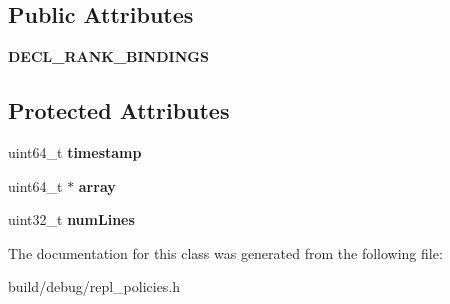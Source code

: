 \subsection*{Public Attributes}
\begin{DoxyCompactItemize}
\item 
\hypertarget{classLRUReplPolicy_a5ccee6aca3822b36fe38b89c3ce198b7}{{\bfseries D\-E\-C\-L\-\_\-\-R\-A\-N\-K\-\_\-\-B\-I\-N\-D\-I\-N\-G\-S}}\label{classLRUReplPolicy_a5ccee6aca3822b36fe38b89c3ce198b7}

\end{DoxyCompactItemize}
\subsection*{Protected Attributes}
\begin{DoxyCompactItemize}
\item 
\hypertarget{classLRUReplPolicy_a65b4e89421966a1190dbff428fc5ea06}{uint64\-\_\-t {\bfseries timestamp}}\label{classLRUReplPolicy_a65b4e89421966a1190dbff428fc5ea06}

\item 
\hypertarget{classLRUReplPolicy_a27cafbd1150c946e99019c32c3aa86a0}{uint64\-\_\-t $\ast$ {\bfseries array}}\label{classLRUReplPolicy_a27cafbd1150c946e99019c32c3aa86a0}

\item 
\hypertarget{classLRUReplPolicy_a1390ad4fdead8484451baebc26d1bdfb}{uint32\-\_\-t {\bfseries num\-Lines}}\label{classLRUReplPolicy_a1390ad4fdead8484451baebc26d1bdfb}

\end{DoxyCompactItemize}


The documentation for this class was generated from the following file\-:\begin{DoxyCompactItemize}
\item 
build/debug/repl\-\_\-policies.\-h\end{DoxyCompactItemize}
